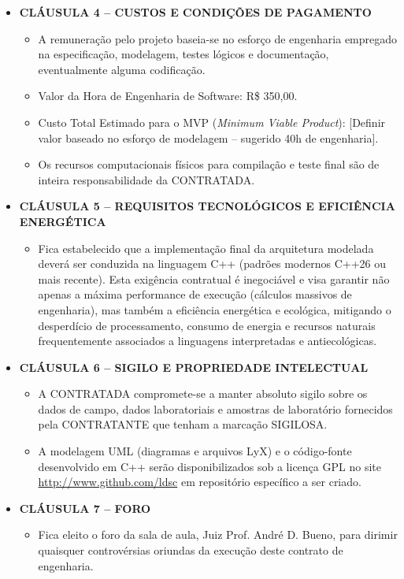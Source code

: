 \documentclass[12pt,a4paper]{article}
\begin{document}
\begin{itemize}[leftmargin=*]
  \item \textbf{CLÁUSULA 4 -- CUSTOS E CONDIÇÕES DE PAGAMENTO}
  \begin{itemize}
    \item A remuneração pelo projeto baseia-se no esforço de engenharia empregado na especificação, modelagem, testes lógicos e documentação, eventualmente alguma codificação.
    \item Valor da Hora de Engenharia de Software: R\$ 350,00.
    \item Custo Total Estimado para o MVP (\textit{Minimum Viable Product}): [Definir valor baseado no esforço de modelagem -- sugerido 40h de engenharia].
    \item Os recursos computacionais físicos para compilação e teste final são de inteira responsabilidade da CONTRATADA.
  \end{itemize}

  \item \textbf{CLÁUSULA 5 -- REQUISITOS TECNOLÓGICOS E EFICIÊNCIA ENERGÉTICA}
  \begin{itemize}
    \item Fica estabelecido que a implementação final da arquitetura modelada deverá ser conduzida na linguagem C++ (padrões modernos C++26 ou mais recente). Esta exigência contratual é inegociável e visa garantir não apenas a máxima performance de execução (cálculos massivos de engenharia), mas também a eficiência energética e ecológica, mitigando o desperdício de processamento, consumo de energia e recursos naturais frequentemente associados a linguagens interpretadas e antiecológicas.
  \end{itemize}

  \item \textbf{CLÁUSULA 6 -- SIGILO E PROPRIEDADE INTELECTUAL}
  \begin{itemize}
    \item A CONTRATADA compromete-se a manter absoluto sigilo sobre os dados de campo, dados laboratoriais e amostras de laboratório fornecidos pela CONTRATANTE que tenham a marcação SIGILOSA.
    \item A modelagem UML (diagramas e arquivos LyX) e o código-fonte desenvolvido em C++ serão disponibilizados sob a licença GPL no site \url{http://www.github.com/ldsc} em repositório específico a ser criado.
  \end{itemize}

  \item \textbf{CLÁUSULA 7 -- FORO}
  \begin{itemize}
    \item Fica eleito o foro da sala de aula, Juiz Prof. André D. Bueno, para dirimir quaisquer controvérsias oriundas da execução deste contrato de engenharia.
  \end{itemize}

\end{itemize}
\end{document}
